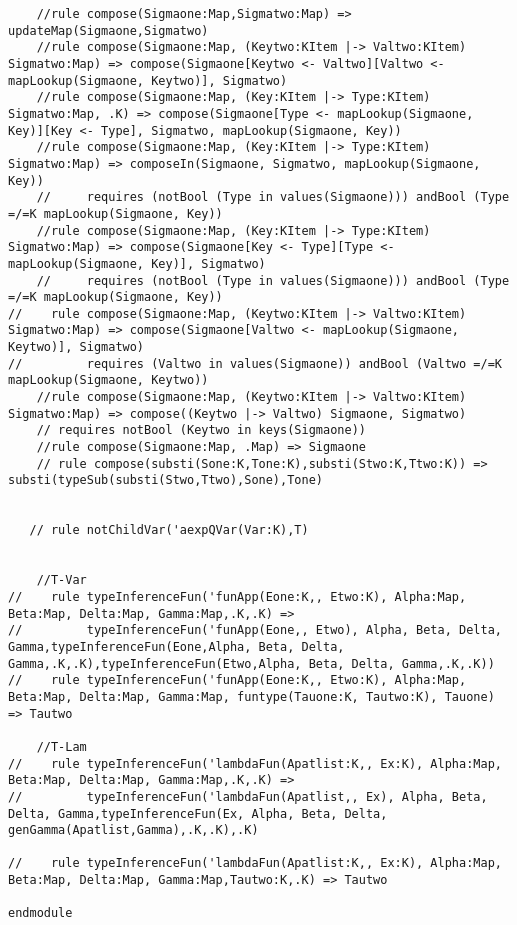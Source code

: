 \begin{lstlisting}
    //rule compose(Sigmaone:Map,Sigmatwo:Map) => updateMap(Sigmaone,Sigmatwo)
    //rule compose(Sigmaone:Map, (Keytwo:KItem |-> Valtwo:KItem) Sigmatwo:Map) => compose(Sigmaone[Keytwo <- Valtwo][Valtwo <- mapLookup(Sigmaone, Keytwo)], Sigmatwo)
    //rule compose(Sigmaone:Map, (Key:KItem |-> Type:KItem) Sigmatwo:Map, .K) => compose(Sigmaone[Type <- mapLookup(Sigmaone, Key)][Key <- Type], Sigmatwo, mapLookup(Sigmaone, Key))
    //rule compose(Sigmaone:Map, (Key:KItem |-> Type:KItem) Sigmatwo:Map) => composeIn(Sigmaone, Sigmatwo, mapLookup(Sigmaone, Key))
    //     requires (notBool (Type in values(Sigmaone))) andBool (Type =/=K mapLookup(Sigmaone, Key))
    //rule compose(Sigmaone:Map, (Key:KItem |-> Type:KItem) Sigmatwo:Map) => compose(Sigmaone[Key <- Type][Type <- mapLookup(Sigmaone, Key)], Sigmatwo)
    //     requires (notBool (Type in values(Sigmaone))) andBool (Type =/=K mapLookup(Sigmaone, Key))
//    rule compose(Sigmaone:Map, (Keytwo:KItem |-> Valtwo:KItem) Sigmatwo:Map) => compose(Sigmaone[Valtwo <- mapLookup(Sigmaone, Keytwo)], Sigmatwo)
//         requires (Valtwo in values(Sigmaone)) andBool (Valtwo =/=K mapLookup(Sigmaone, Keytwo))
    //rule compose(Sigmaone:Map, (Keytwo:KItem |-> Valtwo:KItem) Sigmatwo:Map) => compose((Keytwo |-> Valtwo) Sigmaone, Sigmatwo)
    // requires notBool (Keytwo in keys(Sigmaone))
    //rule compose(Sigmaone:Map, .Map) => Sigmaone
    // rule compose(substi(Sone:K,Tone:K),substi(Stwo:K,Ttwo:K)) => substi(typeSub(substi(Stwo,Ttwo),Sone),Tone)


   // rule notChildVar('aexpQVar(Var:K),T)


    //T-Var
//    rule typeInferenceFun('funApp(Eone:K,, Etwo:K), Alpha:Map, Beta:Map, Delta:Map, Gamma:Map,.K,.K) =>
//         typeInferenceFun('funApp(Eone,, Etwo), Alpha, Beta, Delta, Gamma,typeInferenceFun(Eone,Alpha, Beta, Delta, Gamma,.K,.K),typeInferenceFun(Etwo,Alpha, Beta, Delta, Gamma,.K,.K))
//    rule typeInferenceFun('funApp(Eone:K,, Etwo:K), Alpha:Map, Beta:Map, Delta:Map, Gamma:Map, funtype(Tauone:K, Tautwo:K), Tauone) => Tautwo

    //T-Lam
//    rule typeInferenceFun('lambdaFun(Apatlist:K,, Ex:K), Alpha:Map, Beta:Map, Delta:Map, Gamma:Map,.K,.K) =>
//         typeInferenceFun('lambdaFun(Apatlist,, Ex), Alpha, Beta, Delta, Gamma,typeInferenceFun(Ex, Alpha, Beta, Delta, genGamma(Apatlist,Gamma),.K,.K),.K)

//    rule typeInferenceFun('lambdaFun(Apatlist:K,, Ex:K), Alpha:Map, Beta:Map, Delta:Map, Gamma:Map,Tautwo:K,.K) => Tautwo

endmodule
\end{lstlisting}